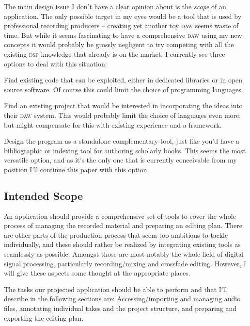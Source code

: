 \documentclass[11pt,a4paper]{article}
\begin{document}
The main design issue I don't have a clear opinion about is the \emph{scope} of
an application.
The only possible target in my eyes would be a tool that is used by
professional recording producers -- creating yet another toy \textsc{daw} seems
waste of time.
But while it seems fascinating to have a comprehensive \textsc{daw} using my new
concepts it would probably be grossly negligent to try competing with all the
existing \textsc{dsp} knowledge that already is on the market.
I currently see three options to deal with this situation:

\begin{itemize*}
\item Find existing code that can be exploited, either in dedicated libraries or
in open source software.
Of course this could limit the choice of programming languages.
\item Find an existing project that would be interested in incorporating the
ideas into their \textsc{daw} system.
This would probably limit the choice of languages even more, but might
compensate for this with existing experience and a framework.
\item Design the program as a standalone complementary tool, just like you'd
have a bibliographic or indexing tool for authoring scholarly books.
This seems the most versatile option, and as it's the only one that is currently
conceivable from my position I'll continue this paper with this option.
\end{itemize*}


\subsection{Intended Scope}

An application should provide a comprehensive set of tools to cover the whole
process of managing the recorded material and preparing an editing plan.
There are other parts of the production process that seem too ambitious to
tackle individually, and these should rather be realized by integrating existing
tools as seamlessly as possible.
Amongst those are most notably the whole field of digital signal processing,
particularly recording/mixing and crossfade editing.
However, I will give these aspects some thought at the appropriate places.

The tasks our projected application should be able to perform and that I'll
describe in the following sections are:
Accessing/importing and managing audio files,
annotating individual takes and the project structure, and
preparing and exporting the editing plan.
\end{document}
